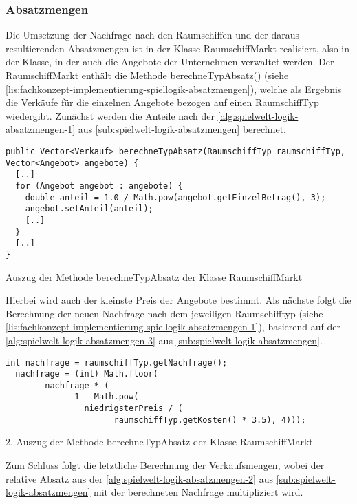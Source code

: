 \subsubsection{Absatzmengen}
\label{subsub:fachkonzept-implementierung-spiellogik-absatzmengen}

Die Umsetzung der Nachfrage nach den Raumschiffen und der daraus resultierenden Absatzmengen ist in der Klasse RaumschiffMarkt realisiert, also in der Klasse, in der auch die Angebote der Unternehmen verwaltet werden. Der RaumschiffMarkt enthält die Methode berechneTypAbsatz() (siehe \ref{lis:fachkonzept-implementierung-spiellogik-absatzmengen}), welche als Ergebnis die Verkäufe für die einzelnen Angebote bezogen auf einen RaumschiffTyp wiedergibt. 
Zunächst werden die Anteile nach der \ref{alg:spielwelt-logik-absatzmengen-1} aus \ref{sub:spielwelt-logik-absatzmengen} berechnet.

\begin{programm}[htbp]
\begin{lstlisting}[breaklines=true]
public Vector<Verkauf> berechneTypAbsatz(RaumschiffTyp raumschiffTyp, Vector<Angebot> angebote) {
  [..]
  for (Angebot angebot : angebote) {
    double anteil = 1.0 / Math.pow(angebot.getEinzelBetrag(), 3);
	angebot.setAnteil(anteil);
	[..]
  }
  [..]
}
\end{lstlisting}
\caption{Auszug der Methode berechneTypAbsatz der Klasse RaumschiffMarkt\label{lis:fachkonzept-implementierung-spiellogik-absatzmengen}}
\end{programm}

Hierbei wird auch der kleinste Preis der Angebote bestimmt. Als nächste folgt die Berechnung der neuen Nachfrage nach dem jeweiligen Raumschifftyp (siehe \ref{lis:fachkonzept-implementierung-spiellogik-absatzmengen-1}), basierend auf der \ref{alg:spielwelt-logik-absatzmengen-3} aus \ref{sub:spielwelt-logik-absatzmengen}.

\begin{programm}[htbp]
\begin{lstlisting}[breaklines=true]
  int nachfrage = raumschiffTyp.getNachfrage();
  nachfrage = (int) Math.floor(
  		nachfrage * (
          	  1 - Math.pow(
           	    niedrigsterPreis / (
              	      raumschiffTyp.getKosten() * 3.5), 4)));
\end{lstlisting}
\caption{2. Auszug der Methode berechneTypAbsatz der Klasse RaumschiffMarkt\label{lis:fachkonzept-implementierung-spiellogik-absatzmengen-1}}
\end{programm}

Zum Schluss folgt die letztliche Berechnung der Verkaufsmengen, wobei der relative Absatz aus der \ref{alg:spielwelt-logik-absatzmengen-2} aus \ref{sub:spielwelt-logik-absatzmengen} mit der berechneten Nachfrage multipliziert wird. 




